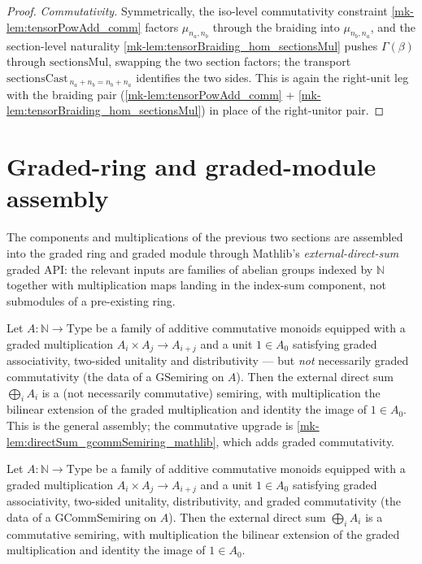 \begin{proof}
  \emph{Commutativity.} Symmetrically, the iso-level commutativity constraint
  \ref{mk-lem:tensorPowAdd_comm} factors \(\mu_{n_a,n_b}\) through the braiding into
  \(\mu_{n_b,n_a}\), and the section-level naturality
  \ref{mk-lem:tensorBraiding_hom_sectionsMul} pushes \(\Gamma(\beta)\) through
  \(\mathrm{sectionsMul}\), swapping the two section factors; the transport
  \(\mathrm{sectionsCast}_{\,n_a+n_b = n_b+n_a}\) identifies the two sides. This is
  again the right-unit leg with the braiding pair (\ref{mk-lem:tensorPowAdd_comm} +
  \ref{mk-lem:tensorBraiding_hom_sectionsMul}) in place of the right-unitor pair.
\end{proof}

\section{Graded-ring and graded-module assembly}
\label{mk-sec:sgr_graded_assembly}

The components and multiplications of the previous two sections are assembled
into the graded ring and graded module through Mathlib's
\emph{external-direct-sum} graded API: the relevant inputs are families of
abelian groups indexed by \(\mathbb{N}\) together with multiplication maps
landing in the index-sum component, not submodules of a pre-existing ring.

\begin{lemma}
  \label{mk-lem:directSum_gsemiring_mathlib}
  \mathlibok

  Let \(A : \mathbb{N} \to \mathrm{Type}\) be a family of additive commutative
  monoids equipped with a graded multiplication \(A_i \times A_j \to A_{i+j}\) and
  a unit \(1 \in A_0\) satisfying graded associativity, two-sided unitality and
  distributivity --- but \emph{not} necessarily graded commutativity (the data of
  a \(\mathrm{GSemiring}\) on \(A\)). Then the external direct sum
  \(\bigoplus_i A_i\) is a (not necessarily commutative) semiring, with
  multiplication the bilinear extension of the graded multiplication and identity
  the image of \(1 \in A_0\). This is the general assembly; the commutative
  upgrade is \ref{mk-lem:directSum_gcommSemiring_mathlib}, which adds graded
  commutativity.
\end{lemma}

\begin{lemma}
  \label{mk-lem:directSum_gcommSemiring_mathlib}
  \mathlibok

  Let \(A : \mathbb{N} \to \mathrm{Type}\) be a family of additive commutative
  monoids equipped with a graded multiplication
  \(A_i \times A_j \to A_{i+j}\) and a unit \(1 \in A_0\) satisfying graded
  associativity, two-sided unitality, distributivity, and graded commutativity
  (the data of a \(\mathrm{GCommSemiring}\) on \(A\)). Then the external direct
  sum \(\bigoplus_i A_i\) is a commutative semiring, with multiplication the
  bilinear extension of the graded multiplication and identity the image of
  \(1 \in A_0\).
\end{lemma}

